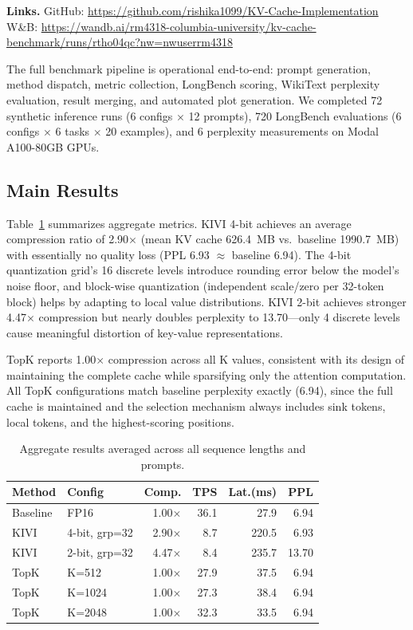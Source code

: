 \documentclass[conference]{IEEEtran}
\begin{document}
\textbf{Links.} GitHub: \url{https://github.com/rishika1099/KV-Cache-Implementation} \\ W\&B: \url{https://wandb.ai/rm4318-columbia-university/kv-cache-benchmark/runs/rtho04qc?nw=nwuserrm4318}

The full benchmark pipeline is operational end-to-end: prompt generation, method dispatch, metric collection, LongBench scoring, WikiText perplexity evaluation, result merging, and automated plot generation. We completed 72 synthetic inference runs (6 configs $\times$ 12 prompts), 720 LongBench evaluations (6 configs $\times$ 6 tasks $\times$ 20 examples), and 6 perplexity measurements on Modal A100-80GB GPUs.

\subsection{Main Results}

Table~\ref{tab:main_results} summarizes aggregate metrics. KIVI 4-bit achieves an average compression ratio of 2.90$\times$ (mean KV cache 626.4~MB vs.\ baseline 1990.7~MB) with essentially no quality loss (PPL 6.93 $\approx$ baseline 6.94). The 4-bit quantization grid's 16 discrete levels introduce rounding error below the model's noise floor, and block-wise quantization (independent scale/zero per 32-token block) helps by adapting to local value distributions. KIVI 2-bit achieves stronger 4.47$\times$ compression but nearly doubles perplexity to 13.70---only 4 discrete levels cause meaningful distortion of key-value representations.

TopK reports 1.00$\times$ compression across all K values, consistent with its design of maintaining the complete cache while sparsifying only the attention computation. All TopK configurations match baseline perplexity exactly (6.94), since the full cache is maintained and the selection mechanism always includes sink tokens, local tokens, and the highest-scoring positions.

\begin{table}[t]
\centering
\caption{Aggregate results averaged across all sequence lengths and prompts.}
\label{tab:main_results}
\begin{tabular}{@{}llrrrr@{}}
\toprule
\textbf{Method} & \textbf{Config} & \textbf{Comp.} & \textbf{TPS} & \textbf{Lat.(ms)} & \textbf{PPL} \\
\midrule
Baseline & FP16 & 1.00$\times$ & 36.1 & 27.9 & 6.94 \\
\midrule
KIVI & 4-bit, grp=32 & 2.90$\times$ & 8.7 & 220.5 & 6.93 \\
KIVI & 2-bit, grp=32 & 4.47$\times$ & 8.4 & 235.7 & 13.70 \\
\midrule
TopK & K=512 & 1.00$\times$ & 27.9 & 37.5 & 6.94 \\
TopK & K=1024 & 1.00$\times$ & 27.3 & 38.4 & 6.94 \\
TopK & K=2048 & 1.00$\times$ & 32.3 & 33.5 & 6.94 \\
\bottomrule
\end{tabular}
\end{table}
\end{document}
